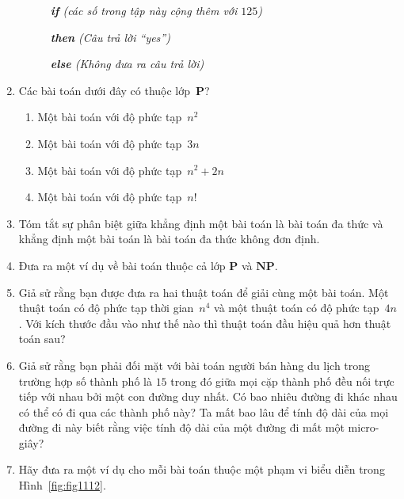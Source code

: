 \begin{multicols}{2}
\begin{enumerate}
\begin{description}
    \item[] \textsl{\textbf{if} (các số trong tập này cộng thêm với $125$)}

    \item []\textsl{\textbf{then} (Câu trả lời ``yes'')}

    \item []\textsl{\textbf{else} (Không đưa ra câu trả lời)}

    \end{description}

  \item Các bài toán dưới đây có thuộc lớp~$\mathbf{P}$?
    \begin{enumerate}
    \item Một bài toán với độ phức tạp~$n^2$

    \item Một bài toán với độ phức tạp~$3n$

    \item Một bài toán với độ phức tạp~$n^2 + 2n$

    \item Một bài toán với độ phức tạp~$n!$
    \end{enumerate}

  \item Tóm tắt sự phân biệt giữa khẳng định một bài toán là bài toán đa thức và khẳng
    định một bài toán là bài toán đa thức không đơn định.

  \item Đưa ra một ví dụ về bài toán thuộc cả lớp $\mathbf{P}$ và $\mathbf{NP}$.

  \item Giả sử rằng bạn được đưa ra hai thuật toán để giải cùng một bài toán. Một thuật
    toán có độ phức tạp thời gian~$n^4$ và một thuật toán có độ phức tạp~$4n$. Với kích
    thước đầu vào như thế nào thì thuật toán đầu hiệu quả hơn thuật toán sau?

  \item Giả sử rằng bạn phải đối mặt với bài toán người bán hàng du lịch trong trường hợp
    số thành phố là $15$ trong đó giữa mọi cặp thành phố đều nối trực tiếp với nhau bởi
    một con đường duy nhất. Có bao nhiêu đường đi khác nhau có thể có đi qua các thành phố
    này? Ta mất bao lâu để tính độ dài của mọi đường đi này biết rằng việc tính độ dài của
    một đường đi mất một micro-giây?

  \item Hãy đưa ra một ví dụ cho mỗi bài toán thuộc một phạm vi biểu diễn trong
    Hình~\ref{fig:fig1112}.


\end{enumerate}
\end{multicols}
